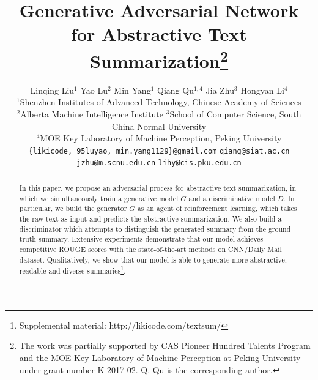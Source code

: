 \documentclass[letterpaper]{article} \usepackage{aaai18}  \usepackage{times}  \usepackage{helvet}  \usepackage{courier}  \usepackage{url}  \usepackage{graphicx}  \frenchspacing  \usepackage{multirow}
\begin{document}
\title{Generative Adversarial Network for Abstractive Text Summarization\thanks{The work was partially supported by CAS Pioneer Hundred Talents Program and the MOE Key Laboratory of Machine Perception at Peking University under grant number K-2017-02. Q. Qu is the corresponding author.}}
\author{Linqing Liu$^{1}$ \hspace{0.3cm}  Yao Lu$^2$ \hspace{0.3cm} Min Yang$^1$ \hspace{0.3cm} Qiang Qu$^{1,4}$ \hspace{0.3cm} Jia Zhu$^3$ \hspace{0.3cm} Hongyan Li$^4$\\
	$^1$Shenzhen Institutes of Advanced Technology, Chinese Academy of Sciences\\ 
	$^2$Alberta Machine Intelligence Institute \space
	$^3$School of Computer Science, South China Normal University\\ 
    $^4$MOE Key Laboratory of Machine Perception, Peking University\\ 
{\tt \{likicode, 95luyao, min.yang1129\}@gmail.com} \hspace{0.3cm} {\tt qiang@siat.ac.cn} \\{\tt jzhu@m.scnu.edu.cn} \hspace{0.3cm} {\tt lihy@cis.pku.edu.cn}
}


\maketitle
\begin{abstract}
In this paper, we propose an adversarial process for abstractive text summarization, in which we simultaneously train a generative model $G$ and  a discriminative model $D$.  In particular,  we build the generator $G$ as an agent of reinforcement learning, which takes the raw text as input and predicts the abstractive summarization.  We also build a discriminator which attempts to distinguish the generated summary from the ground truth summary.  Extensive experiments demonstrate that our model achieves competitive ROUGE scores with the state-of-the-art methods on CNN/Daily Mail dataset.  Qualitatively, we show that our model is able to generate more abstractive, readable and diverse summaries\footnote{Supplemental material: http://likicode.com/textsum/}. 
\end{abstract}
\end{document}
